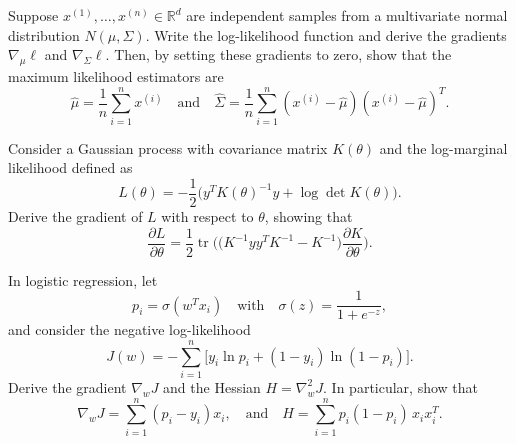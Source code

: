 \begin{exercise}
   Suppose $x^{(1)},\dots,x^{(n)} \in \mathbb{R}^d$ are independent samples from a multivariate normal distribution $N(\mu,\Sigma)$. Write the log-likelihood function and derive the gradients $\nabla_\mu \ell$ and $\nabla_\Sigma \ell$. Then, by setting these gradients to zero, show that the maximum likelihood estimators are
   \[
      \hat\mu = \frac{1}{n}\sum_{i=1}^n x^{(i)} \quad \text{and} \quad \hat\Sigma = \frac{1}{n}\sum_{i=1}^n (x^{(i)} - \hat\mu)(x^{(i)} - \hat\mu)^T.
   \]
\end{exercise}

\begin{exercise}
   Consider a Gaussian process with covariance matrix $K(\theta)$ and the log-marginal likelihood defined as
   \[
      L(\theta) = -\frac{1}{2}\Big(y^T K(\theta)^{-1} y + \log\det K(\theta)\Big).
   \]
   Derive the gradient of $L$ with respect to $\theta$, showing that
   \[
      \frac{\partial L}{\partial \theta} = \frac{1}{2}\operatorname{tr}\!\Big(\Big(K^{-1}yy^T K^{-1} - K^{-1}\Big)\frac{\partial K}{\partial \theta}\Big).
   \]
\end{exercise}

\begin{exercise}
   In logistic regression, let 
   \[
      p_i = \sigma(w^T x_i) \quad \text{with} \quad \sigma(z)=\frac{1}{1+e^{-z}},
   \]
   and consider the negative log-likelihood
   \[
      J(w) = -\sum_{i=1}^n \Big[y_i\ln p_i + (1-y_i)\ln(1-p_i)\Big].
   \]
   Derive the gradient $\nabla_w J$ and the Hessian $H = \nabla^2_w J$. In particular, show that
   \[
      \nabla_w J = \sum_{i=1}^n (p_i - y_i)x_i, \quad \text{and} \quad H = \sum_{i=1}^n p_i(1-p_i)\,x_i x_i^T.
   \]
\end{exercise}

